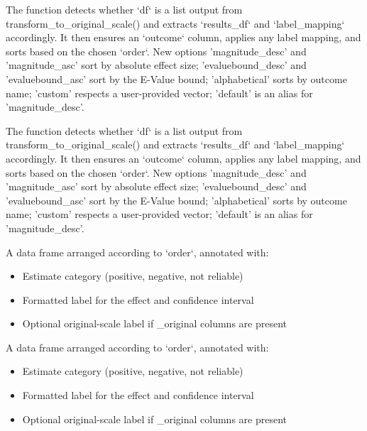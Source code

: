 \documentclass[a4paper]{book}
\begin{document}
%
\begin{Details}
The function detects whether `df` is a list output from transform\_to\_original\_scale()
and extracts `results\_df` and `label\_mapping` accordingly. It then ensures an `outcome`
column, applies any label mapping, and sorts based on the chosen `order`. New options
'magnitude\_desc' and 'magnitude\_asc' sort by absolute effect size; 'evaluebound\_desc'
and 'evaluebound\_asc' sort by the E-Value bound; 'alphabetical' sorts by outcome
name; 'custom' respects a user-provided vector; 'default' is an alias for 'magnitude\_desc'.

The function detects whether `df` is a list output from transform\_to\_original\_scale()
and extracts `results\_df` and `label\_mapping` accordingly. It then ensures an `outcome`
column, applies any label mapping, and sorts based on the chosen `order`. New options
'magnitude\_desc' and 'magnitude\_asc' sort by absolute effect size; 'evaluebound\_desc'
and 'evaluebound\_asc' sort by the E-Value bound; 'alphabetical' sorts by outcome
name; 'custom' respects a user-provided vector; 'default' is an alias for 'magnitude\_desc'.
\end{Details}
%
\begin{Value}
A data frame arranged according to `order`, annotated with:
\begin{itemize}

\item{} Estimate category (positive, negative, not reliable)
\item{} Formatted label for the effect and confidence interval
\item{} Optional original-scale label if \_original columns are present

\end{itemize}


A data frame arranged according to `order`, annotated with:
\begin{itemize}

\item{} Estimate category (positive, negative, not reliable)
\item{} Formatted label for the effect and confidence interval
\item{} Optional original-scale label if \_original columns are present

\end{itemize}

\end{Value}
%
\end{document}
